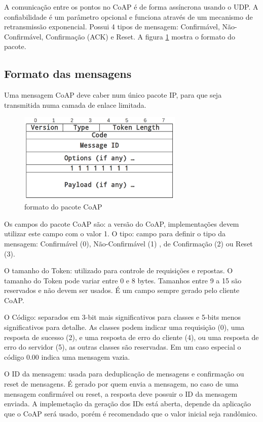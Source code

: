 A comunica\c{c}\~ao entre os pontos no CoAP \'e de forma ass\'incrona usando o UDP. A confiabilidade \'e um par\^ametro opcional e funciona atrav\'es de um mecanismo de retransmiss\~ao exponencial. Possui 4 tipos de mensagem: Confirm\'avel, N\~ao-Confirm\'avel, Confirma\c{c}\~ao (ACK) e Reset. A figura \ref{coapFormat} mostra o formato do pacote.

\subsection{Formato das mensagens}
Uma mensagem CoAP deve caber num \'unico pacote IP, para que seja transmitida numa camada de enlace limitada.
\begin{figure}[h]
    \label{coapFormat}
    \centering
    \includegraphics[width=0.7\textwidth]{figuras/formato.png}
    \caption{formato do pacote CoAP  \cite{draft-ietf-core-coap-18}}
\end{figure}


Os campos do pacote CoAP s\~ao: a vers\~ao do CoAP, implementa\c{c}\~oes devem utilizar este campo com o valor 1. O tipo: campo para definir o tipo da mensagem: Confirm\'avel (0), N\~ao-Confirm\'avel (1) , de Confirma\c{c}\~ao (2) ou Reset (3).

O tamanho do Token: utilizado para controle de requisi\c{c}\~oes e repostas. O tamanho do Token pode variar entre 0 e 8 bytes. Tamanhos entre 9 a 15 s\~ao reservados e n\~ao devem ser usados. \'E um campo sempre gerado pelo cliente CoAP.

O C\'odigo: separados em 3-bit mais significativos para classes e 5-bits menos significativos para detalhe. As classes podem indicar uma requisi\c{c}\~ao (0), uma resposta de sucesso (2), e uma resposta de erro do cliente (4), ou uma resposta de erro do servidor (5), as outras classes s\~ao reservadas. Em um caso especial o c\'odigo 0.00 indica uma mensagem vazia.

O ID da mensagem: usada para deduplica\c{c}\~ao de mensagens e confirma\c{c}\~ao ou reset de mensagens. \'E gerado por quem envia a mensagem, no caso de uma mensagem confirm\'avel ou reset, a resposta deve possuir o ID da mensagem enviada. A implemeta\c{c}\~ao da gera\c{c}\~ao dos IDs est\'a aberta, depende da aplica\c{c}\~ao que o CoAP ser\'a usado, por\'em \'e recomendado que o valor inicial seja rand\^omico.
   

